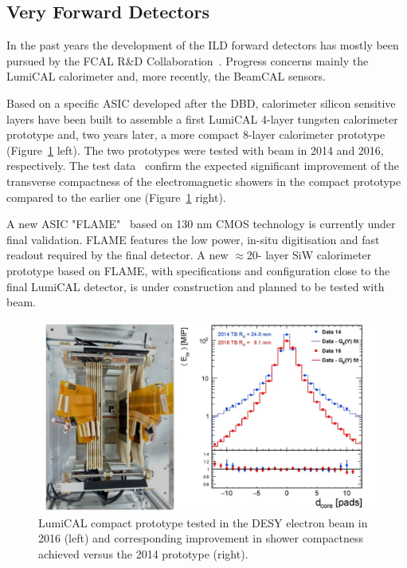 \subsection{Very Forward Detectors}

In the past years the development of the ILD forward detectors has mostly been pursued by the FCAL R\&D Collaboration~\cite{ild:bib:FCAL}. Progress concerns mainly the LumiCAL calorimeter and, more recently, the BeamCAL sensors.

Based on a specific ASIC developed after the DBD, calorimeter silicon sensitive layers have been built to assemble a first LumiCAL 4-layer tungsten calorimeter prototype and, two years later, a more compact 8-layer calorimeter prototype (Figure~\ref{fig:det:LUMICAL_perf} left). The two prototypes were tested with beam in 2014 and 2016, respectively. The test data~\cite{Abramowicz:2018vwb} confirm the expected significant improvement of the transverse compactness of the electromagnetic showers in the compact prototype compared to the earlier one (Figure~\ref{fig:det:LUMICAL_perf} right). 

A new ASIC "FLAME"~\cite{ild:bib:FLAME} based on 130 nm CMOS technology is currently under final validation. FLAME features the low power, in-situ digitisation and fast readout required by the final detector. A new $\approx$20- layer SiW calorimeter prototype based on FLAME, with specifications and configuration close to the final LumiCAL detector, is under construction and planned to be tested with beam. 

\begin{figure}[t!]
\centering
\includegraphics[width=1.0\hsize]{Detector/fig/LUMICAL_perf.jpg}
\caption{LumiCAL compact prototype tested in the DESY electron beam in 2016 (left) and corresponding improvement in shower compactness achieved versus the 2014 prototype (right).}
\label{fig:det:LUMICAL_perf}
\end{figure}

